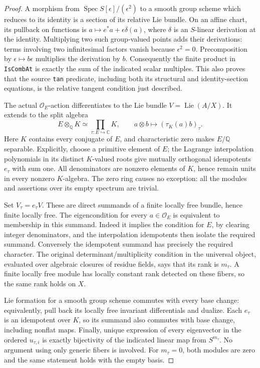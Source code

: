 \documentclass[11pt,a4paper]{article}
\numberwithin{equation}{section}
\theoremstyle{remark}\newtheorem{remark}[theorem]{Remark}
\begin{document}
\begin{proof}
A morphism from \(\operatorname{Spec}S[\epsilon]/(\epsilon^2)\)
to a smooth group scheme which reduces to its identity is a section
of its relative Lie bundle.  On an affine chart, its pullback on
functions is \(a\mapsto e^*a+\epsilon\delta(a)\), where
\(\delta\) is an \(S\)-linear derivation at the identity.  Multiplying
two such group-valued points adds their derivations: terms involving
two infinitesimal factors vanish because \(\epsilon^2=0\).
Precomposition by \(\epsilon\mapsto b\epsilon\) multiplies the
derivation by \(b\).  Consequently the finite product in
\texttt{Is\allowbreak Comb\allowbreak At} is exactly the sum of the indicated scalar
multiples.  This also proves that the source \texttt{tan} predicate,
including both its structural and identity-section equations, is
the relative tangent condition just described.

The actual \(\mathcal O_E\)-action differentiates to the Lie bundle
\(V=\operatorname{Lie}(A/X)\).  It extends to the split algebra
\[
 E\otimes_{\mathbb Q}K\simeq\prod_{\tau:E\hookrightarrow\mathbb C}K,
 \qquad a\otimes b\longmapsto(\tau_K(a)b)_\tau .             \tag{TDR.3}
\]
Here \(K\) contains every conjugate of \(E\), and characteristic
zero makes \(E/\mathbb Q\) separable.  Explicitly, choose a primitive
element of \(E\); the Lagrange interpolation polynomials in its
distinct \(K\)-valued roots give mutually orthogonal idempotents
\(e_\tau\) with sum one.  All denominators are nonzero elements
of \(K\), hence remain units in every nonzero \(K\)-algebra.
The zero ring causes no exception: all the modules and assertions
over its empty spectrum are trivial.

Set \(V_\tau=e_\tau V\).  These are direct summands of a finite
locally free bundle, hence finite locally free.  The eigencondition
for every \(a\in\mathcal O_E\) is equivalent to membership in this
summand.  Indeed it implies the condition for \(E\), by clearing
integer denominators, and the interpolation idempotents then isolate
the required summand.  Conversely the idempotent summand has precisely
the required character.  The original determinant/multiplicity
condition in the universal object, evaluated over algebraic closures
of residue fields, says that its rank is \(m_\tau\).  A finite
locally free module has locally constant rank detected on these
fibers, so the same rank holds on \(X\).

Lie formation for a smooth group scheme commutes with every base
change: equivalently, pull back its locally free invariant
differentials and dualize.  Each \(e_\tau\) is an idempotent over
\(K\), so its summand also commutes with base change, including
nonflat maps.  Finally, unique expression of every eigenvector in
the ordered \(u_{\tau,i}\) is exactly bijectivity of the indicated
linear map from \(S^{m_\tau}\).  No argument using only generic
fibers is involved.  For \(m_\tau=0\), both modules are zero and
the same statement holds with the empty basis.
\end{proof}
\end{document}
